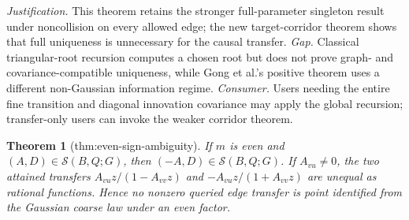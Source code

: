 \documentclass{article}
\newtheorem{theorem}{Theorem}
\begin{document}
\par\smallskip\noindent \textit{Justification.} This theorem retains the stronger full-parameter singleton result under noncollision on every allowed edge; the new target-corridor theorem shows that full uniqueness is unnecessary for the causal transfer. \textit{Gap.} Classical triangular-root recursion computes a chosen root but does not prove graph- and covariance-compatible uniqueness, while Gong et al.'s positive theorem uses a different non-Gaussian information regime. \textit{Consumer.} Users needing the entire fine transition and diagonal innovation covariance may apply the global recursion; transfer-only users can invoke the weaker corridor theorem.

\begin{theorem}[thm:even-sign-ambiguity]\label{thm:even-sign-ambiguity}
If \(m\) is even and \((A,D)\in\mathcal S(B,Q;G)\), then \((-A,D)\in\mathcal S(B,Q;G)\). If \(A_{vu}\ne0\), the two attained transfers \(A_{vu}z/(1-A_{vv}z)\) and \(-A_{vu}z/(1+A_{vv}z)\) are unequal as rational functions. Hence no nonzero queried edge transfer is point identified from the Gaussian coarse law under an even factor.
\end{theorem}
\end{document}
